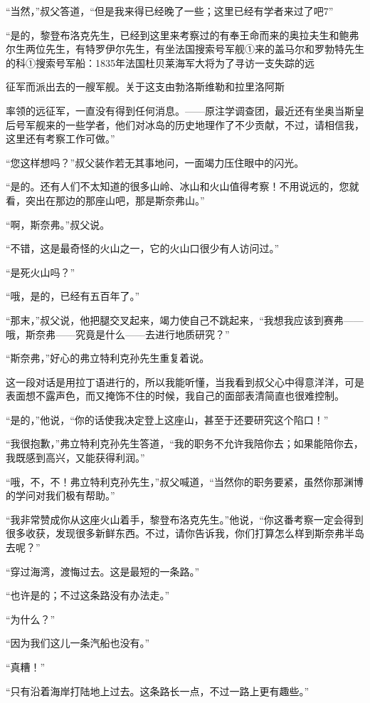\documentclass[10pt]{book}
\begin{document}
“当然，”叔父答道，“但是我来得已经晚了一些；这里已经有学者来过了吧7”

“是的，黎登布洛克先生，已经到这里来考察过的有奉王命而来的奥拉夫生和鲍弗尔生两位先生，有特罗伊尔先生，有坐法国搜索号军舰①来的盖马尔和罗勃特先生的科①搜索号军船：1835年法国杜贝莱海军大将为了寻访一支失踪的远

征军而派出去的一艘军舰。关于这支由勃洛斯维勒和拉里洛阿斯

率领的远征军，一直没有得到任何消息。——原注学调查团，最近还有坐奥当斯皇后号军舰来的一些学者，他们对冰岛的历史地理作了不少贡献，不过，请相信我，这里还有考察工作可做。”

“您这样想吗？”叔父装作若无其事地问，一面竭力压住眼中的闪光。

“是的。还有人们不太知道的很多山岭、冰山和火山值得考察！不用说远的，您就看，突出在那边的那座山吧，那是斯奈弗山。”

“啊，斯奈弗。”叔父说。

“不错，这是最奇怪的火山之一，它的火山口很少有人访问过。”

“是死火山吗？”

“哦，是的，已经有五百年了。”

“那末，”叔父说，他把腿交叉起来，竭力使自己不跳起来，“我想我应该到赛弗——哦，斯奈弗——究竟是什么——去进行地质研究？”

“斯奈弗，”好心的弗立特利克孙先生重复着说。

这一段对话是用拉丁语进行的，所以我能听懂，当我看到叔父心中得意洋洋，可是表面想不露声色，而又掩饰不住的时候，我自己的面部表清简直也很难控制。

“是的，”他说，“你的话使我决定登上这座山，甚至于还要研究这个陷口！”

“我很抱歉，”弗立特利克孙先生答道，“我的职务不允许我陪你去；如果能陪你去，我既感到高兴，又能获得利润。”

“哦，不，不！弗立特利克孙先生，”叔父喊道，“当然你的职务要紧，虽然你那渊博的学问对我们极有帮助。”

“我非常赞成你从这座火山着手，黎登布洛克先生。”他说，“你这番考察一定会得到很多收获，发现很多新鲜东西。不过，请你告诉我，你们打算怎么样到斯奈弗半岛去呢？”

“穿过海湾，渡悔过去。这是最短的一条路。”

“也许是的；不过这条路没有办法走。”

“为什么？”

“因为我们这儿一条汽船也没有。”

“真糟！”

“只有沿着海岸打陆地上过去。这条路长一点，不过一路上更有趣些。”
\end{document}
